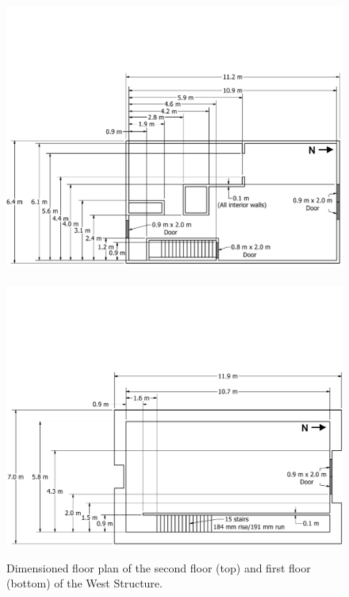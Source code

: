 \documentclass[12pt,oneside]{book}
\begin{document}
\begin{figure}[!ht]
	\includegraphics[width=\columnwidth]{../Figures/Floor_Plans/West_Structure_2nd_Floor_Dimensioned_Full}
	\\~\\
	\includegraphics[width=\columnwidth]{../Figures/Floor_Plans/West_Structure_1st_Floor_Dimensioned_Full}
	\caption[Dimensioned floor plans of the West Structure.]{Dimensioned floor plan of the second floor (top) and first floor (bottom) of the West Structure.}
	\label{fig:west_dimensioned_plan}
\end{figure}

\FloatBarrier
\end{document}
